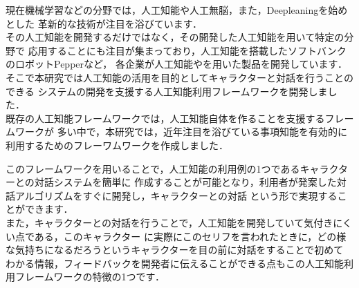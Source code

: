 %

現在機械学習などの分野では，人工知能や人工無脳，また，Deepleaningを始めとした
革新的な技術が注目を浴びています．
\\
その人工知能を開発するだけではなく，その開発した人工知能を用いて特定の分野で
応用することにも注目が集まっており，人工知能を搭載したソフトバンクのロボットPepperなど，
各企業が人工知能やを用いた製品を開発しています．
\\
そこで本研究では人工知能の活用を目的としてキャラクターと対話を行うことのできる
システムの開発を支援する人工知能利用フレームワークを開発しました．
\\
既存の人工知能フレームワークでは，人工知能自体を作ることを支援するフレームワークが
多い中で，本研究では，近年注目を浴びている事項知能を有効的に利用するためのフレーワムワークを作成しました．

このフレームワークを用いることで，人工知能の利用例の1つであるキャラクターとの対話システムを簡単に
作成することが可能となり，利用者が発案した対話アルゴリズムをすぐに開発し，キャラクターとの対話
という形で実現することができます．\\

また，キャラクターとの対話を行うことで，人工知能を開発していて気付きにくい点である，このキャラクター
に実際にこのセリフを言われたときに，どの様な気持ちになるだろうというキャラクターを目の前に対話をすることで初めて
わかる情報，フィードバックを開発者に伝えることができる点もこの人工知能利用フレームワークの特徴の1つです．
